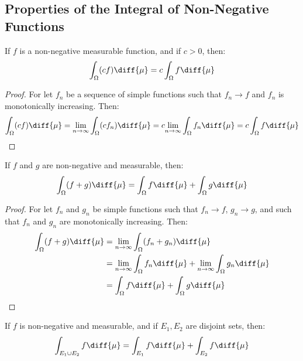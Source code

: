     \subsection{Properties of the Integral of Non-Negative Functions}
    \begin{theorem}
        If $f$ is a non-negative measurable function, and if $c>0$, then:
        \begin{equation}
            \int_{\Omega}(cf)\diff{\mu}=c\int_{\Omega}f\diff{\mu}
        \end{equation}
    \end{theorem}
    \begin{proof}
        For let $f_{n}$ be a sequence of simple functions such that
        $f_{n}\rightarrow{f}$ and $f_{n}$ is monotonically increasing. Then:
        \begin{equation}
            \int_{\Omega}(cf)\diff{\mu}=\underset{n\rightarrow\infty}{\lim}
            \int_{\Omega}(cf_{n})\diff{\mu}=c\underset{n\rightarrow\infty}{\lim}
            \int_{\Omega}f_{n}\diff{\mu}=c\int_{\Omega}f\diff{\mu}
        \end{equation}
    \end{proof}
    \begin{theorem}
        If $f$ and $g$ are non-negative and measurable, then:
        \begin{equation}
            \int_{\Omega}(f+g)\diff{\mu}
            =\int_{\Omega}f\diff{\mu}+\int_{\Omega}g\diff{\mu}
        \end{equation}
    \end{theorem}
    \begin{proof}
        For let $f_{n}$ and $g_{n}$ be simple functions such that
        $f_{n}\rightarrow{f}$, $g_{n}\rightarrow{g}$, and such that $f_{n}$ and
        $g_{n}$ are monotonically increasing. Then:
        \begin{align}
            \int_{\Omega}(f+g)\diff{\mu}
            &=\underset{n\rightarrow\infty}{\lim}
            \int_{\Omega}(f_{n}+g_{n})\diff{\mu}\\
            &=\underset{n\rightarrow\infty}{\lim}
            \int_{\Omega}f_{n}\diff{\mu}+
            \underset{n\rightarrow\infty}{\lim}
            \int_{\Omega}g_{n}\diff{\mu}\\
            &=\int_{\Omega}f\diff{\mu}+\int_{\Omega}g\diff{\mu}
        \end{align}
    \end{proof}
    \begin{theorem}
        If $f$ is non-negative and measurable, and if
        $E_{1},E_{2}$ are disjoint sets, then:
        \begin{equation}
            \int_{E_{1}\cup{E}_{2}}f\diff{\mu}
            =\int_{E_{1}}f\diff{\mu}+\int_{E_{2}}f\diff{\mu}
        \end{equation}
    \end{theorem}
